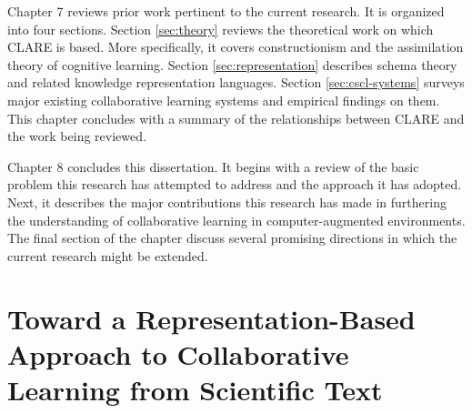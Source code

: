 Chapter 7 reviews prior work pertinent to the current research. It is
organized into four sections. Section \ref{sec:theory} reviews the
theoretical work on which CLARE is based.  More specifically, it covers
constructionism and the assimilation theory of cognitive learning. Section
\ref{sec:representation} describes schema theory and related knowledge
representation languages.  Section \ref{sec:cscl-systems} surveys major
existing collaborative learning systems and empirical findings on them.
This chapter concludes with a summary of the relationships between CLARE
and the work being reviewed.

Chapter 8 concludes this dissertation. It begins with a review of the basic
problem this research has attempted to address and the approach it has
adopted. Next, it describes the major contributions this research has made
in furthering the understanding of collaborative learning in
computer-augmented environments. The final section of the chapter discuss
several promising directions in which the current research might be
extended.






\setcounter{chapter}{1}
\chapter{Toward a Representation-Based Approach to Collaborative
Learning from Scientific Text}
\label{sec:approach}

